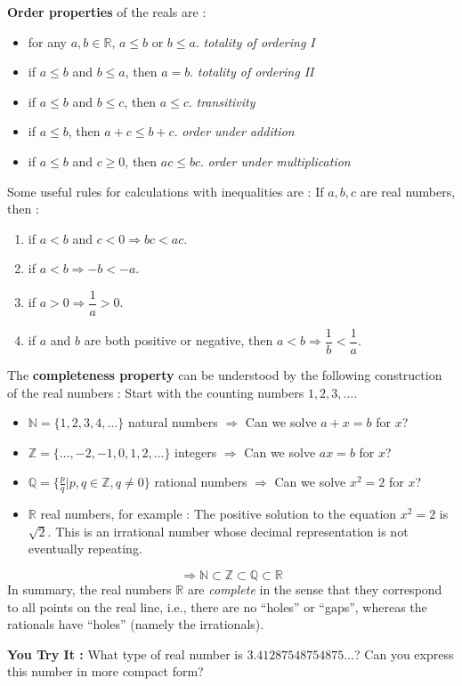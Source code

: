 \documentclass[titlepage,a4paper,12pt]{report}
\begin{document}
\begin{enumerate}
\textbf{Order properties} of the reals are :
\begin{itemize}
\item[(O1)] for any $a,b\in \mathbb{R}, \, a\leq b$ or $b\leq a$. \textit{totality of ordering I}
\item[(O2)] if $a\leq b$ and $b\leq a$, then $a=b$. \textit{totality of ordering II}
\item[(O3)] if $a\leq b$ and $b\leq c$, then $a\leq c$. \textit{transitivity}
\item[(O4)] if $a\leq b$, then $a+c\leq b+c$. \textit{order under addition}
\item[(O5)] if $a\leq b$ and $c\geq 0$, then $ac\leq bc$. \textit{order under multiplication} 
\end{itemize}
Some useful rules for calculations with inequalities are : If $a,b,c$ are real numbers, then :
\begin{enumerate}
\item if $a<b$ and $c<0 \Rightarrow bc<ac$.
\item if $a<b \Rightarrow -b<-a$.
\item if $a>0\Rightarrow \dfrac{1}{a}>0$.
\item if $a$ and $b$ are both positive or negative, then $a<b\Rightarrow \dfrac{1}{b} <\dfrac{1}{a}$.
\end{enumerate}
The \textbf{completeness property} can be understood by the following construction of the real numbers :
Start with the counting numbers $1,2,3,\dots .$
\begin{itemize}
\item $\mathbb{N}=\{1,2,3,4,\dots \}$ natural numbers $\Rightarrow$ Can we solve $a+x=b$ for $x$?
\item $\mathbb{Z}=\{\dots , -2,-1,0,1,2,\dots\}$ integers $\Rightarrow$ Can we solve  $ax=b$ for $x$?
\item $\mathbb{Q} =\{\frac{p}{q} | p,q \in \mathbb{Z}, q\neq 0\}$ rational numbers $\Rightarrow$ Can we solve $x^2=2$ for $x$?
\item $\mathbb{R}$ real numbers, for example : The positive solution to the equation $x^2=2$ is $\sqrt{2}$. This is an irrational number whose decimal representation is not eventually repeating.
\end{itemize}

\begin{equation*}
\Rightarrow \boxed {\mathbb{N}\subset \mathbb{Z}\subset \mathbb{Q}\subset \mathbb{R}}
\end{equation*}
In summary, the real numbers $\mathbb{R}$ are \textit{complete} in the sense that they correspond to all points on the real line, i.e., there are no ``holes'' or ``gaps'', whereas the rationals have ``holes'' (namely the irrationals).

\textbf{You Try It :} What type of real number is $3.41287548754875\dots$? Can you express this number in more compact form?
\end{enumerate}
\end{document}
